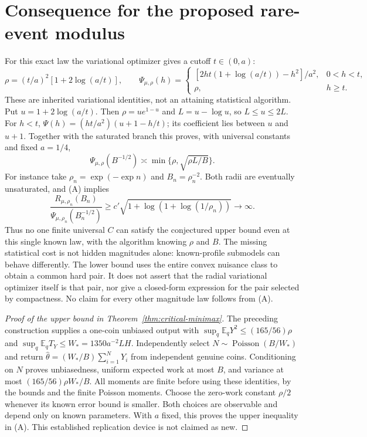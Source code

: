 \documentclass[11pt]{article}
\newcommand{\E}{\mathbb E}
\begin{document}
\section{Consequence for the proposed rare-event modulus}
For this exact law the variational optimizer gives a cutoff $t\in(0,a)$:
\[
 \rho=(t/a)^2[1+2\log(a/t)],\qquad
 \Psi_{\mu,\rho}(h)=
 \begin{cases}
 [2ht(1+\log(a/t))-h^2]/a^2,&0<h<t,\\
 \rho,&h\ge t.
 \end{cases}                                          \tag{E}
\]
These are inherited variational identities, not an attaining statistical
algorithm. Put $u=1+2\log(a/t)$. Then $\rho=u e^{1-u}$ and
$L=u-\log u$, so $L\le u\le2L$. For $h<t$,
$\Psi(h)=(ht/a^2)(u+1-h/t)$; its coefficient lies between $u$ and $u+1$.
Together with the saturated branch this proves, with universal constants
and fixed $a=1/4$,
\[
 \Psi_{\mu,\rho}(B^{-1/2})\asymp\min\{\rho,\sqrt{\rho L/B}\}.
\]
For instance take $\rho_n=\exp(-\exp n)$ and $B_n=\rho_n^{-2}$.
Both radii are eventually unsaturated, and (A) implies
\[
 \frac{R_{\mu,\rho_n}(B_n)}{\Psi_{\mu,\rho_n}(B_n^{-1/2})}
       \ge c'\sqrt{1+\log(1+\log(1/\rho_n))}\longrightarrow\infty.
\]
Thus no one finite universal $C$ can
satisfy the conjectured upper bound even at this single known law, with
the algorithm knowing $\rho$ and $B$. The missing statistical cost is not
hidden magnitudes alone: known-profile submodels can behave differently.
The lower bound uses the entire convex nuisance class to obtain a common
hard pair. It does not assert that the radial variational optimizer itself
is that pair, nor give a closed-form expression for the pair selected by
compactness. No claim for every other magnitude law follows from (A).

\appendix


\begin{proof}[Proof of the upper bound in Theorem~\ref{thm:critical-minimax}]
The preceding construction supplies a one-coin unbiased output with
$\sup_q\E_qY^2\le(165/56)\rho$ and
$\sup_q\E_qT_Y\le W_*=1350a^{-2}LH$. Independently select
$N\sim\operatorname{Poisson}(B/W_*)$ and return
$\widehat\theta=(W_*/B)\sum_{i=1}^NY_i$ from independent genuine coins.
Conditioning on $N$ proves unbiasedness, uniform expected work at most $B$,
and variance at most $(165/56)\rho W_*/B$. All moments are finite before
using these identities, by the bounds and the finite Poisson moments.
Choose the zero-work constant $\rho/2$ whenever its known error bound is
smaller. Both choices are observable and depend only on known parameters.
With $a$ fixed, this proves the upper inequality in (A). This established
replication device is not claimed as new.
\end{proof}
\end{document}
